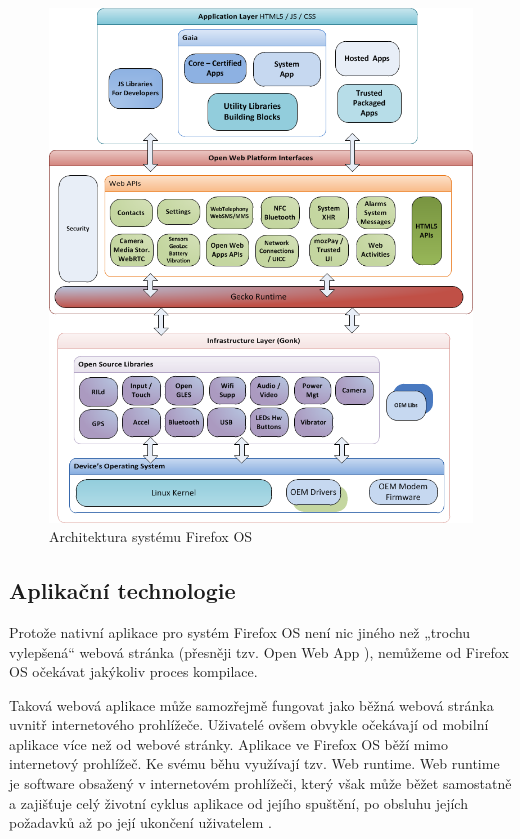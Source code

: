 \begin{figure}\centering
\includegraphics[width=1.0\textwidth]{FirefoxOS_architecture.png}
\caption{Architektura systému Firefox OS \cite{fxOs_architecture}}
\label{fig:FxOSArchitecture}
\end{figure}

\subsection{Aplikační technologie}
Protože nativní aplikace pro systém Firefox OS není nic jiného než „trochu vylepšená“ webová stránka (přesněji tzv. Open Web App \cite{faqs_mozilla}), nemůžeme od Firefox OS očekávat jakýkoliv proces kompilace.

Taková webová aplikace může samozřejmě fungovat jako běžná webová stránka uvnitř internetového prohlížeče. Uživatelé ovšem obvykle očekávají od mobilní aplikace více než od webové stránky. Aplikace ve Firefox OS běží mimo internetový prohlížeč. Ke svému běhu využívají tzv. Web runtime. Web runtime je software obsažený v internetovém prohlížeči, který však může běžet samostatně a zajišťuje celý životní cyklus aplikace od jejího spuštění, po obsluhu jejích požadavků až po její ukončení uživatelem \cite{apps_architecture}.

